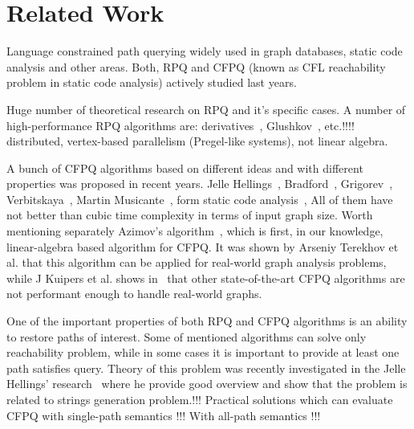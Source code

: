 \section{Related Work}

Language constrained path querying widely used in graph databases, static code analysis and other areas.
Both, RPQ and CFPQ (known as CFL reachability problem in static code analysis) actively studied last years.

Huge number of theoretical research on RPQ and it's specific cases.
A number of high-performance RPQ algorithms are: derivatives~\cite{10.1145/2949689.2949711}, Glushkov~\cite{Wang2019}, etc.!!!!~\cite{!!!} distributed, vertex-based parallelism (Pregel-like systems), not linear algebra.

A bunch of CFPQ algorithms based on different ideas and with different properties was proposed in recent years.
Jelle Hellings~\cite{hellingsRelational}, Bradford~\cite{8249039}, Grigorev~\cite{!!!}, Verbitskaya~\cite{10.1007/978-3-319-41579-6_22}, Martin Musicante~\cite{10.1007/978-3-319-91662-0_17,Medeiros:2018:EEC:3167132.3167265}, form static code analysis~\cite{!!!}, 
All of them have not better than cubic time complexity in terms of input graph size. 
Worth mentioning separately Azimov's algorithm~\cite{Azimov:2018:CPQ:3210259.3210264}, which is first, in our knowledge, linear-algebra based algorithm for CFPQ. 
It was shown by Arseniy Terekhov et al.\cite{!!!} that this algorithm can be applied for real-world graph analysis problems, while J Kuipers et al. shows in~\cite{!!!} that other state-of-the-art CFPQ algorithms are not performant enough to handle real-world graphs.

One of the important properties of both RPQ and CFPQ algorithms is an ability to restore paths of interest. 
Some of mentioned algorithms can solve only reachability problem, while in some cases it is important to provide at least one path satisfies query.
Theory of this problem was recently investigated in the Jelle Hellings' research~\cite{!!!} where he provide good overview and show that the problem is related to strings generation problem.!!!
Practical solutions which can evaluate CFPQ with single-path semantics !!! With all-path semantics !!! 

